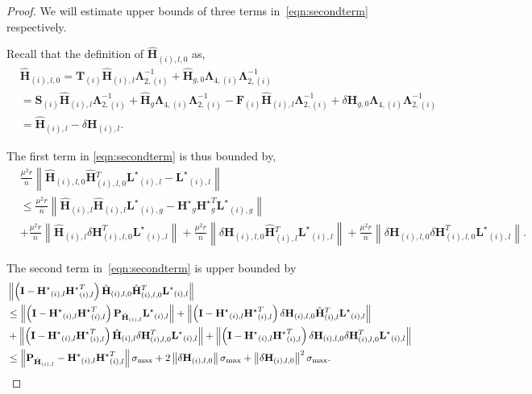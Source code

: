 \documentclass[twoside,11pt]{article}
\newcommand{\norm}[1]{\left\lVert#1\right\rVert}
\newcommand{\matF}{\mathbf{F}}
\newcommand{\hmatH}{{\hat{\mathbf{H}}}{}}
\newcommand{\matHst}{{\mathbf{H}^\star}}
\newcommand{\matI}{\mathbf{I}}
\newcommand{\matLst}{{\mathbf{L}^\star}}
\newcommand{\matP}{\mathbf{P}}
\newcommand{\matT}{\mathbf{T}}
\newcommand{\matLambda}{\mathbf{\Lambda}}
\newcommand{\matS}{\mathbf{S}}
\newcommand{\dtmatH}{\delta\mathbf{H}}
\newcommand{\gop}{\sigma_{\max}}
\newcommand{\murnb}{\frac{\mu^2 r}{\overline{n}}}
\begin{document}
\begin{proof}
We will estimate upper bounds of three terms in~\eqref{eqn:secondterm} respectively. 

Recall that the definition of $\hmatH_{(i),l,0}$ as,
\begin{align*}
&\hmatH_{(i),l,0} = \matT_{(i)}\hmatH_{
(i),l}\matLambda_{2,(i)}^{-1}+
\hmatH_{g,0}\matLambda_{4,(i)}\matLambda_{2,(i)}^{-1}\\
&=\matS_{(i)}\hmatH_{
(i),l}\matLambda_{2,(i)}^{-1}+
\hmatH_{g}\matLambda_{4,(i)}\matLambda_{2,(i)}^{-1}-\matF_{(i)}\hmatH_{(i),l}\matLambda_{2,(i)}^{-1}+\dtmatH_{g,0}\matLambda_{4,(i)}\matLambda_{2,(i)}^{-1}\\
&=\hmatH_{(i),l}-\dtmatH_{(i),l}.
\end{align*}

The first term in \eqref{eqn:secondterm} is thus bounded by,
\begin{align*}
&\murnb\norm{\hmatH_{(i),l,0}\hmatH_{(i),l,0}^T\matLst_{(i),l}-\matLst_{(i),l}}\\
&\le \murnb\norm{\hmatH_{(i),l}\hmatH_{(i),l}\matLst_{(i),g}-\matHst_{g}\matHst_{g}^T\matLst_{(i),g}}\\
&+\murnb\norm{\hmatH_{(i),l}\dtmatH_{(i),l,0}^T\matLst_{(i),l}}+\murnb\norm{\dtmatH_{(i),l,0}\hmatH_{(i),l}^T\matLst_{(i),l}}+\murnb\norm{\dtmatH_{(i),l,0}\dtmatH_{(i),l,0}^T\matLst_{(i),l}}.
\end{align*}

The second term in~\eqref{eqn:secondterm} is upper bounded by
\begin{align*}
&\norm{\left(\matI-\matHst_{(i),l}\matHst_{(i),l}^T\right)\hmatH_{(i),l,0}\hmatH_{(i),l,0}^T\matLst_{(i),l}}\notag\\
&\le \norm{\left(\matI-\matHst_{(i),l}\matHst_{(i),l}^T\right)\matP_{\hmatH_{(i),l}}\matLst_{(i),l}}+\norm{\left(\matI-\matHst_{(i),l}\matHst_{(i),l}^T\right)\dtmatH_{(i),l,0}\hmatH_{(i),l}^T\matLst_{(i),l}}\\
&+\norm{\left(\matI-\matHst_{(i),l}\matHst_{(i),l}^T\right)\hmatH_{(i),l}\dtmatH_{(i),l,0}^T\matLst_{(i),l}}+\norm{\left(\matI-\matHst_{(i),l}\matHst_{(i),l}^T\right)\dtmatH_{(i),l,0}\dtmatH_{(i),l,0}^T\matLst_{(i),l}}\\
&\le \norm{\matP_{\hmatH_{(i),l}}-\matHst_{(i),l}\matHst_{(i),l}^T}\gop+2\norm{\dtmatH_{(i),l,0}}\gop+\norm{\dtmatH_{(i),l,0}}^2\gop.
\end{align*}


\end{proof}
\end{document}

